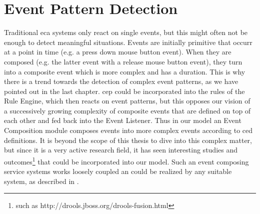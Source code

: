 \section{Event Pattern Detection}
Traditional \textrm{\acrshort{eca}} systems only react on single events, but this might often not be enough to detect meaningful situations.
Events are initially primitive that occurr at a point in time (e.g. a press down mouse button event).
When they are composed (e.g. the latter event with a release mouse button event), they turn into a composite event which is more complex and has a duration.
This is why there is a trend towards the detection of complex event patterns, as we have pointed out in the last chapter.
\textrm{\acrshort{cep}} could be incorporated into the rules of the \textrm{Rule Engine}, which then reacts on event patterns, but this opposes our vision of a successively growing complexity of composite events that are defined on top of each other and fed back into the \textrm{Event Listener}.
Thus in our model an \textrm{Event Composition} module composes events into more complex events according to \textrm{\acrshort{ced}} definitions.
It is beyond the scope of this thesis to dive into this complex matter, but since it is a very active research field, it has seen interesting studies\cite{akdere2008plan}\cite{2004_1265833} and outcomes\footnote{such as http://drools.jboss.org/drools-fusion.html} that could be incorporated into our model.
Such an event composing service systems works loosely coupled an could be realized by any suitable system, as described in \cite{robins2010complex}.



